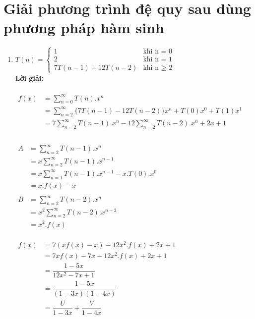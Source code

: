 \documentclass[12pt, letterpaper]{article}
\begin{document}
\section{Giải phương trình đệ quy sau dùng phương pháp hàm sinh}
\begin{enumerate}
    \item 
    $T(n) = 
    \begin{cases}
        1 & \text{khi n = 0} \\
        2 & \text{khi n = 1} \\
        7T(n - 1) + 12T(n-2) & \text{khi n $\geq$ 2}
    \end{cases} $ \\
    \textbf{Lời giải:} \\
     \\
    $\begin{aligned}
        f(x) &= \sum_{n = 0}^{\infty}T(n).x^n \\
            &= \sum_{n = 2}^{\infty} \{ 7T(n-1)-12T(n-2) \}x^n + T(0)x^0 + T(1)x^1 \\
            &= 7\sum_{n = 2}^{\infty}T(n-1).x^n - 12\sum_{n = 2}^{\infty} T(n-2).x^n + 2x +1 \\
    \end{aligned} $ \\

    \\
    $\begin{aligned}
        A &= \sum_{n = 2}^{\infty}T(n-1).x^n \\
        &=x\sum_{n = 2}^{\infty}T(n-1).x^{n-1}\\
        &=x\sum_{n = 1}^{\infty}T(n-1).x^{n-1} - x.T(0).x^0\\
        &=x.f(x) - x\\
    \end{aligned}$\\
    $\begin{aligned}
        B &=\sum_{n = 2}^{\infty}T(n-2).x^n\\
        &=x^2\sum_{n = 2}^{\infty}T(n-2).x^{n-2}\\
        &=x^2.f(x)
    \end{aligned}$\\

    \\
    $\begin{aligned}
        f(x) &=7(xf(x)-x)-12x^2.f(x)+2x+1\\
            &=7xf(x)-7x-12x^2.f(x)+2x+1\\
            &= \dfrac{1-5x}{12x^2-7x+1}\\
            &= \dfrac{1-5x}{(1-3x)(1-4x)}\\
            &= \dfrac{U}{1-3x} + \dfrac{V}{1-4x}\\
    \end{aligned}$\\


\end{enumerate}
\end{document}
